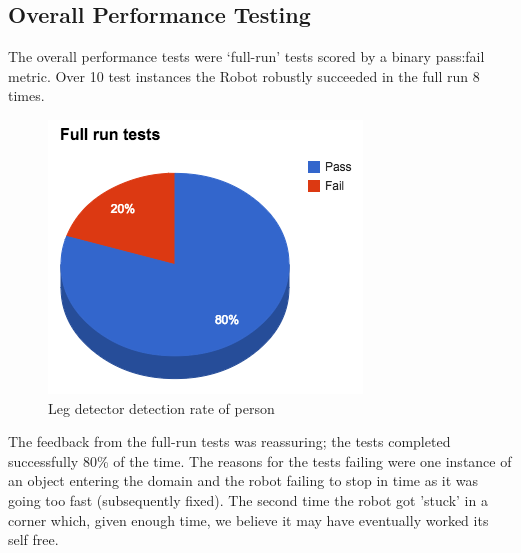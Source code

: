 \documentclass{article}
\begin{document}
	\subsection{Overall Performance Testing}
	The overall performance tests were ‘full-run’ tests scored by a binary pass:fail metric. Over 10 test instances the Robot robustly succeeded in the full run 8 times. 
	\begin{figure}[H]
	\begin{center}
	\includegraphics[width=0.8\linewidth]{ExperimentalResults13}
	\caption{Leg detector detection rate of person}
	\end{center}
	\end{figure}
	The feedback from the full-run tests was reassuring; the tests completed successfully 80\% of the time. The reasons for the tests failing were one instance of an object entering the domain and the robot failing to stop in time as it was going too fast (subsequently fixed). The second time the robot got 'stuck' in a corner which, given enough time, we believe it may have eventually worked its self free.
\end{document}
